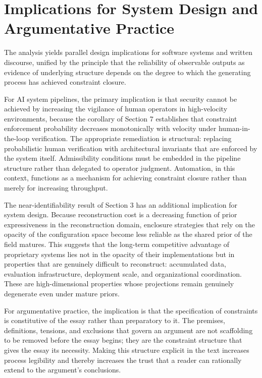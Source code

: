 \documentclass[12pt, oneside]{article}
\theoremstyle{plain}
\theoremstyle{definition}
\theoremstyle{remark}
\begin{document}
\section{Implications for System Design and Argumentative Practice}

The analysis yields parallel design implications for software systems and written discourse,
unified by the principle that the reliability of observable outputs as evidence of underlying
structure depends on the degree to which the generating process has achieved constraint
closure.

For AI system pipelines, the primary implication is that security cannot be achieved by
increasing the vigilance of human operators in high-velocity environments, because the
corollary of Section 7 establishes that constraint enforcement probability decreases
monotonically with velocity under human-in-the-loop verification. The appropriate
remediation is structural: replacing probabilistic human verification with architectural
invariants that are enforced by the system itself. Admissibility conditions must be embedded
in the pipeline structure rather than delegated to operator judgment. Automation, in this
context, functions as a mechanism for achieving constraint closure rather than merely for
increasing throughput.

The near-identifiability result of Section 3 has an additional implication for system design.
Because reconstruction cost is a decreasing function of prior expressiveness in the
reconstruction domain, enclosure strategies that rely on the opacity of the configuration
space become less reliable as the shared prior of the field matures. This suggests that the
long-term competitive advantage of proprietary systems lies not in the opacity of their
implementations but in properties that are genuinely difficult to reconstruct: accumulated
data, evaluation infrastructure, deployment scale, and organizational coordination. These
are high-dimensional properties whose projections remain genuinely degenerate even under
mature priors.

For argumentative practice, the implication is that the specification of constraints is
constitutive of the essay rather than preparatory to it. The premises, definitions, tensions,
and exclusions that govern an argument are not scaffolding to be removed before the essay
begins; they are the constraint structure that gives the essay its necessity. Making this
structure explicit in the text increases process legibility and thereby increases the trust
that a reader can rationally extend to the argument's conclusions.
\end{document}
